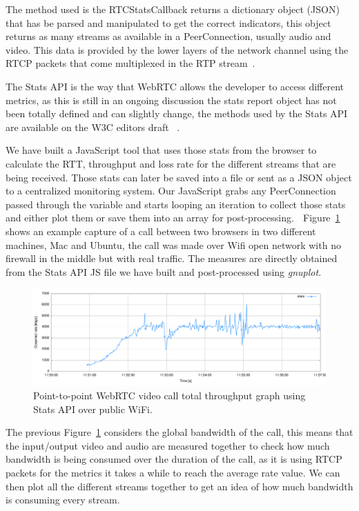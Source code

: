 The method used is the RTCStatsCallback returns a dictionary object (JSON) that has be parsed and manipulated to get the correct indicators, this object returns as many streams as available in a PeerConnection, usually audio and video. This data is provided by the lower layers of the network channel using the RTCP packets that come multiplexed in the RTP stream~\cite{rtpusageIETF}.

The Stats API is the way that WebRTC allows the developer to access different metrics, as this is still in an ongoing discussion the stats report object has not been totally defined and can slightly change, the methods used by the Stats API are available on the W3C editors draft ~\cite{editorWebRTCdraft}. 

We have built a JavaScript tool that uses those stats from the browser to calculate the RTT, throughput and loss rate for the different streams that are being received. Those stats can later be saved into a file or sent as a JSON object to a centralized monitoring system. Our JavaScript grabs any PeerConnection passed through the variable and starts looping an iteration to collect those stats and either plot them or save them into an array for post-processing. 

Figure~\ref{fig:onetooneWifiRTC} shows an example capture of a call between two browsers in two different machines, Mac and Ubuntu, the call was made over Wifi open network with no firewall in the middle but with real traffic. The measures are directly obtained from the Stats API JS file we have built and post-processed using {\it gnuplot}.

 \begin{figure}[h]
  \centering
    \includegraphics[width=1\textwidth]{./figures/onetooneWifiStatsRTC.pdf}
      \caption[Point-to-point WebRTC video call total throughput graph using Stats API over public WiFi]{Point-to-point WebRTC video call total throughput graph using Stats API over public WiFi.}
	\label{fig:onetooneWifiRTC}
\end{figure}

The previous Figure~\ref{fig:onetooneWifiRTC} considers the global bandwidth of the call, this means that the input/output video and audio are measured together to check how much bandwidth is being consumed over the duration of the call, as it is using RTCP packets for the metrics it takes a while to reach the average rate value. We can then plot all the different streams together to get an idea of how much bandwidth is consuming every stream.


